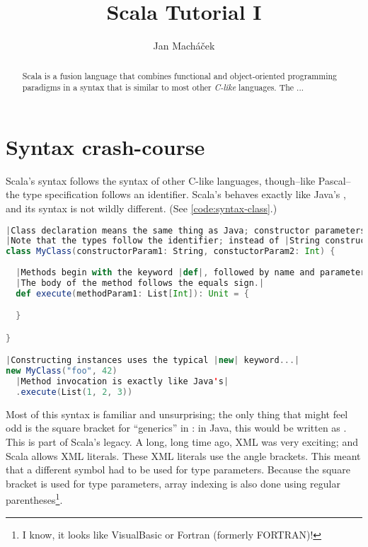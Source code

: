 \documentclass[10 pt]{article}
\title{Scala Tutorial I}
\author{Jan Macháček}
\begin{document}
\maketitle
\begin{abstract}
  Scala is a fusion language that combines functional and object-oriented programming paradigms in a syntax that is similar to most other \emph{C-like} languages. The ...
\end{abstract}
\bigskip

\section{Syntax crash-course}
Scala's syntax follows the syntax of other C-like languages, though--like Pascal--the type specification follows an identifier. Scala's  behaves exactly like Java's , and its syntax is not wildly different. (See \autoref{code:syntax-class}.)

\begin{lstlisting}[caption={Classes and methods}, label={code:syntax-class}, language=Scala, escapechar=|]
|Class declaration means the same thing as Java; constructor parameters are specified in the block immediately following the class name.|
|Note that the types follow the identifier; instead of |String constructorParam1| Scala uses |constructorParam1: String
class MyClass(constructorParam1: String, constuctorParam2: Int) {
  
  |Methods begin with the keyword |def|, followed by name and parameters. The return type follows similar pattern; |Unit| means |void.
  |The body of the method follows the equals sign.|
  def execute(methodParam1: List[Int]): Unit = {

  }

}

|Constructing instances uses the typical |new| keyword...|
new MyClass("foo", 42)
  |Method invocation is exactly like Java's|
  .execute(List(1, 2, 3))
\end{lstlisting}

Most of this syntax is familiar and unsurprising; the only thing that might feel odd is the square bracket for ``generics'' in : in Java, this would be written as . This is part of Scala's legacy. A long, long time ago, XML was very exciting; and Scala allows XML literals. These XML literals use the angle brackets. This meant that a different symbol had to be used for type parameters. Because the square bracket is used for type parameters, array indexing is also done using regular parentheses\footnote{I know, it looks like VisualBasic or Fortran (formerly FORTRAN)!}.
\end{document}
